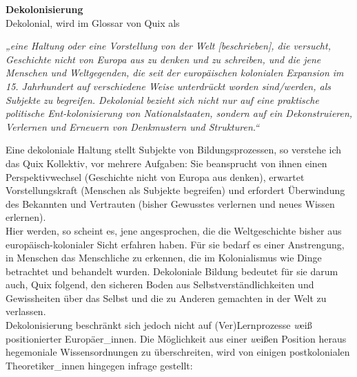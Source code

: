 \textbf{\large Dekolonisierung}\\
Dekolonial, wird im Glossar von Quix\footnotemark{} als
\begin{myenv} \textit{„eine Haltung oder eine Vorstellung von der Welt
  [beschrieben], die versucht, Geschichte nicht von Europa aus zu denken und zu
schreiben, und die jene Menschen und Weltgegenden, die seit der europäischen
kolonialen Expansion im 15. Jahrhundert auf verschiedene Weise unterdrückt
worden sind/werden, als Subjekte zu begreifen. Dekolonial bezieht sich nicht
nur auf eine praktische politische Ent-kolonisierung von Nationalstaaten,
sondern auf ein Dekonstruieren, Verlernen und Erneuern von Denkmustern und
Strukturen.“\footnotemark{}} \end{myenv}
Eine dekoloniale Haltung stellt Subjekte von Bildungsprozessen, so verstehe ich
das Quix Kollektiv, vor mehrere Aufgaben: Sie beansprucht von ihnen einen
Perspektivwechsel (Geschichte nicht von Europa aus denken), erwartet
Vorstellungskraft (Menschen als Subjekte begreifen) und erfordert Überwindung
des Bekannten und Vertrauten (bisher Gewusstes verlernen und neues Wissen
erlernen).\\
Hier werden, so scheint es, jene angesprochen, die die Weltgeschichte bisher
aus europäisch-kolonialer Sicht erfahren haben. Für sie bedarf es einer
Anstrengung, in Menschen das Menschliche zu erkennen, die im Kolonialismus wie
Dinge betrachtet und behandelt wurden. Dekoloniale Bildung bedeutet für sie
darum auch, Quix folgend, den sicheren Boden aus Selbstverständlichkeiten und
Gewissheiten über das Selbst und die zu Anderen gemachten in der Welt zu
verlassen.\\
Dekolonisierung beschränkt sich jedoch nicht auf (Ver)Lernprozesse \textit{w}eiß
positionierter Europäer\_innen. Die Möglichkeit aus einer \textit{w}eißen Position heraus
hegemoniale Wissensordnungen zu überschreiten, wird von einigen postkolonialen
Theoretiker\_innen hingegen infrage gestellt:

